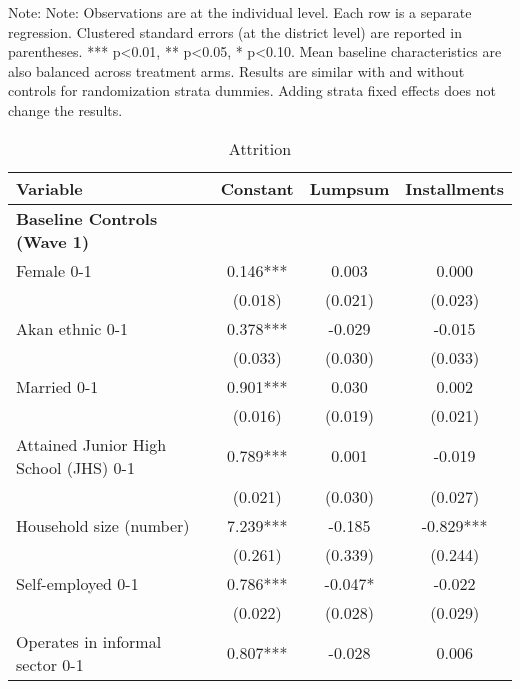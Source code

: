 \begin{ThreePartTable}
\begin{TableNotes}[flushleft]
\footnotesize
\item Note:                                  Note: Observations are at the individual level. Each row is a separate regression. Clustered standard errors (at the district level) are reported in parentheses. *** p<0.01, ** p<0.05, * p<0.10. Mean baseline characteristics are also balanced across treatment arms. Results are similar with and without controls for randomization strata dummies. Adding strata fixed effects does not change the results.                                 
\end{TableNotes}
\begin{table}[tbp]\centering
\def\sym#1{\ifmmode^{#1}\else\(^{#1}\)\fi}
\caption{Attrition}
\begin{tabular}{lccc}
\hline
 Variable & Constant & Lumpsum & Installments \\ [0.1em] 
\hline\hline
\textbf{Baseline Controls (Wave 1)} & & & \\ 
 Female 0-1 & 0.146*** & 0.003 & 0.000 \\ [0.1em] 
                   &      (0.018)     &      (0.021)     &      (0.023)     \\ [0.1em] 
 Akan ethnic 0-1 & 0.378*** & -0.029 & -0.015 \\ [0.1em] 
                   &      (0.033)     &      (0.030)     &      (0.033)     \\ [0.1em] 
 Married 0-1 & 0.901*** & 0.030 & 0.002 \\ [0.1em] 
                   &      (0.016)     &      (0.019)     &      (0.021)     \\ [0.1em] 
 Attained Junior High School (JHS) 0-1 & 0.789*** & 0.001 & -0.019 \\ [0.1em] 
                   &      (0.021)     &      (0.030)     &      (0.027)     \\ [0.1em] 
 Household size (number) & 7.239*** & -0.185 & -0.829*** \\ [0.1em] 
                   &      (0.261)     &      (0.339)     &      (0.244)     \\ [0.1em] 
 Self-employed 0-1 & 0.786*** & -0.047* & -0.022 \\ [0.1em] 
                   &      (0.022)     &      (0.028)     &      (0.029)     \\ [0.1em] 
 Operates in informal sector 0-1 & 0.807*** & -0.028 & 0.006 \\ [0.1em] 

\end{tabular}
\end{table}
\end{ThreePartTable}
